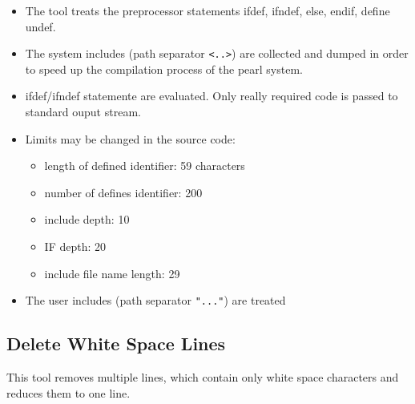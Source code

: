 	\begin{itemize}
	\item The tool treats the preprocessor statements 
	ifdef, ifndef, else, endif, define undef.
	\item The system includes (path separator \verb|<..>|) are collected
	and dumped in order to speed up the compilation process of the 
	pearl system.
	\item ifdef/ifndef statemente are evaluated. Only really required code
	   is passed to standard ouput stream.
	\item Limits may be changed in the source code: 
	   \begin{itemize}
	   \item length of defined identifier: 59 characters
	   \item number of defines identifier: 200
	   \item include depth: 10
	   \item IF depth: 20
	   \item include file name length: 29
	   \end{itemize}
	\item The user includes (path separator \verb|"..."|) are treated
	\end{itemize}
	 

	\subsection{Delete White Space Lines}
	This tool removes multiple lines, which contain only white space characters
	and reduces them to one line.



